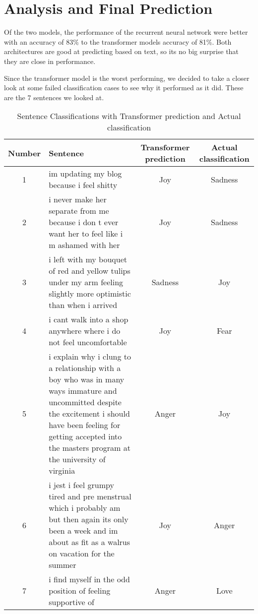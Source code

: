 \section{Analysis and Final Prediction}
Of the two models, the performance of the recurrent neural network were better with an accuracy of 83\% to the transformer models accuracy of 81\%. Both architectures are good at predicting based on text, so its no big surprise that they are close in performance. 

Since the transformer model is the worst performing, we decided to take a closer look at some failed classification cases to see why it performed as it did. These are the 7 sentences we looked at.

\begin{table}[H]
    \centering
    \renewcommand{\arraystretch}{1.5} %
    \setlength{\tabcolsep}{8pt} %
    
    \begin{tabular}{c|p{8cm}|c|c|}
    \hline 
    \textbf{Number} & \textbf{Sentence} & \textbf{Transformer prediction} & \textbf{Actual classification} \\ \hline
    1 & im updating my blog because i feel shitty & Joy & Sadness \\ \hline
    2 & i never make her separate from me because i don t ever want her to feel like i m ashamed with her & Joy & Sadness \\ \hline
    3 & i left with my bouquet of red and yellow tulips under my arm feeling slightly more optimistic than when i arrived & Sadness & Joy \\ \hline
    4 & i cant walk into a shop anywhere where i do not feel uncomfortable & Joy & Fear \\ \hline
    5 & i explain why i clung to a relationship with a boy who was in many ways immature and uncommitted despite the excitement i should have been feeling for getting accepted into the masters program at the university of virginia & Anger & Joy \\ \hline
    6 & i jest i feel grumpy tired and pre menstrual which i probably am but then again its only been a week and im about as fit as a walrus on vacation for the summer & Joy & Anger \\ \hline
    7 & i find myself in the odd position of feeling supportive of & Anger & Love \\ \hline
    \end{tabular}
    \caption{Sentence Classifications with Transformer prediction and Actual classification}
    \label{tab:sentence_classifications}
    \end{table}

